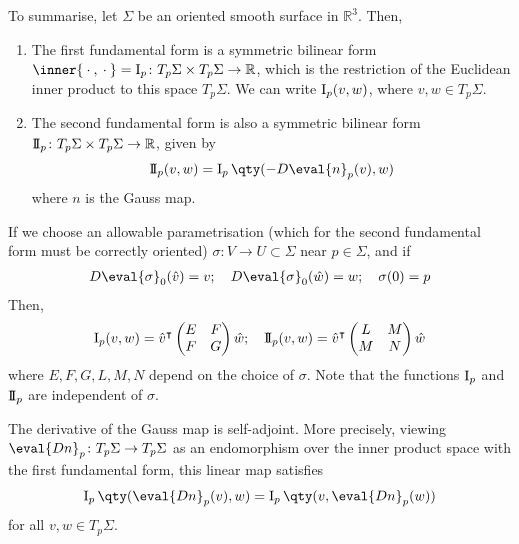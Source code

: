 \begin{remark}
	To summarise, let $\Sigma$ be an oriented smooth surface in $\mathbb R^3$.
	Then,
	\begin{enumerate}
		\item The first fundamental form is a symmetric bilinear form $\inner{\wildcard,\wildcard} = \Iff_p \colon T_p \Sigma \times T_p \Sigma \to \mathbb R$, which is the restriction of the Euclidean inner product to this space $T_p \Sigma$.
		      We can write $\operatorname{\mathrm{I}}_p(v,w)$, where $v, w \in T_p \Sigma$.
		\item The second fundamental form is also a symmetric bilinear form $\operatorname{\mathrm{I\!I}}_p \colon T_p \Sigma \times T_p \Sigma \to \mathbb R$, given by
		      \begin{align*}
			      \IIff_p(v,w) = \Iff_p\qty(-D\eval{n}_p(v), w)
		      \end{align*}
		      where $n$ is the Gauss map.
	\end{enumerate}
	If we choose an allowable parametrisation (which for the second fundamental form must be correctly oriented) $\sigma \colon V \to U \subset \Sigma$ near $p \in \Sigma$, and if
	\begin{align*}
		D \eval{\sigma}_0(\hat v) = v;\quad D \eval{\sigma}_0(\hat w) = w;\quad \sigma(0) = p
	\end{align*}
	Then,
	\begin{align*}
		\operatorname{\mathrm{I}}_p(v,w) = {\hat v}^\intercal \begin{pmatrix}
			E & F \\
			F & G
		\end{pmatrix} \hat w;\quad \operatorname{\mathrm{I\!I}}_p(v,w) = {\hat v}^\intercal \begin{pmatrix}
			L & M \\
			M & N
		\end{pmatrix} \hat w
	\end{align*}
	where $E, F, G, L, M, N$ depend on the choice of $\sigma$.
	Note that the functions $\operatorname{\mathrm{I}}_p$ and $\operatorname{\mathrm{I\!I}}_p$ are independent of $\sigma$.
\end{remark}

\begin{lemma}
	The derivative of the Gauss map is self-adjoint.
	More precisely, viewing $\eval{Dn}_p \colon T_p \Sigma \to T_p \Sigma$ as an endomorphism over the inner product space with the first fundamental form, this linear map satisfies
	\begin{align*}
		\Iff_p\qty(\eval{Dn}_p(v), w) = \Iff_p\qty(v, \eval{Dn}_p(w))
	\end{align*}
	for all $v, w \in T_p \Sigma$.
\end{lemma}


